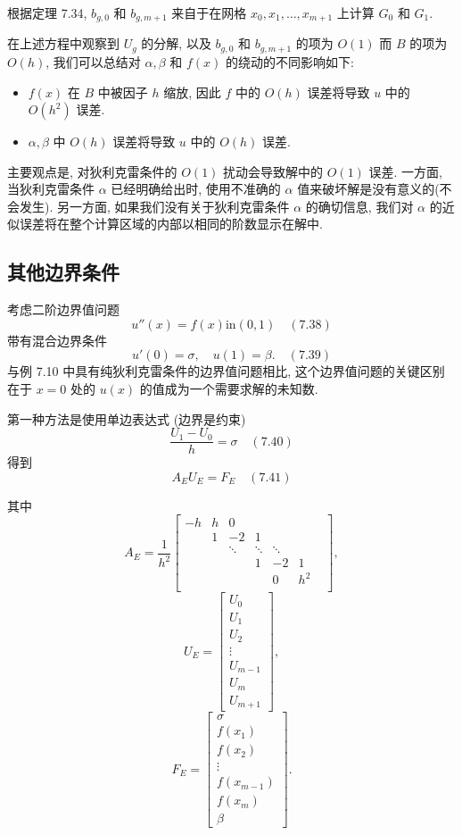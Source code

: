 \documentclass[a4paper]{ctexart}
\newcommand{\hl}[1]
{\noindent {\bf {#1}}}
\begin{document}
{根据定理 7.34, $b_{g, 0}$ 和 $b_{g, m + 1}$ 
来自于在网格 $x_0, x_1, \ldots, x_{m + 1} $ 上计算 $G_0$ 和 $G_1$.

在上述方程中观察到 $U_g$ 的分解, 以及 $b_{g,0}$ 和 $b_{g,m + 1}$ 的项为 
$O(1)$ 而 $B$ 的项为 $O(h)$, 我们可以总结对 $\alpha, \beta$ 和 $f(x)$ 
的绕动的不同影响如下:
\begin{itemize}
  \item $f(x)$ 在 $B$ 中被因子 $h$ 缩放, 
  因此 $f$ 中的 $O(h)$ 误差将导致 $u$ 中的 $O(h^2)$ 误差.
  \item $\alpha, \beta$ 中 $O(h)$ 误差将导致 $u$ 中的 $O(h)$ 误差.
\end{itemize}
主要观点是, 对狄利克雷条件的 $O(1)$ 扰动会导致解中的 $O(1)$ 误差.
一方面, 当狄利克雷条件 $\alpha$ 已经明确给出时, 
使用不准确的 $\alpha$ 值来破坏解是没有意义的(不会发生). 
另一方面, 如果我们没有关于狄利克雷条件 $\alpha$ 的确切信息, 
我们对 $\alpha$ 的近似误差将在整个计算区域的内部以相同的阶数显示在解中.


\subsection{其他边界条件}

\hl{例 7.35} 考虑二阶边界值问题
$$
u''(x) = f(x) \text{in} (0, 1) \quad (7.38)
$$
带有混合边界条件
$$
u'(0) = \sigma, \quad u(1) = \beta. \quad (7.39)
$$
与例 7.10 中具有纯狄利克雷条件的边界值问题相比, 
这个边界值问题的关键区别在于 $x = 0$ 处的 $u(x)$ 的值成为一个需要求解的未知数.

第一种方法是使用单边表达式 (边界是约束)
$$
\frac{U_1 - U_0}{h} = \sigma \quad (7.40)
$$
得到
$$
A_EU_E = F_E \quad (7.41)
$$

其中
$$
A_E = \frac{1}{h^2} \begin{bmatrix}
-h & h & 0 &  & & \\
&1 & -2 & 1 &  & & \\
& & \ddots & \ddots & \ddots & \\
& &  & 1 & -2 & 1 \\
&  &  &  & 0 & h^2 \\
\end{bmatrix},
$$
$$
U_E = \begin{bmatrix}
U_0 \\
U_1 \\
U_2 \\
\vdots \\
U_{m-1} \\
U_m \\
U_{m+1}
\end{bmatrix},
$$
$$
F_E = \begin{bmatrix}
\sigma \\
f(x_1) \\
f(x_2) \\
\vdots \\
f(x_{m-1}) \\
f(x_m) \\
\beta
\end{bmatrix}.
$$

}
\end{document}
